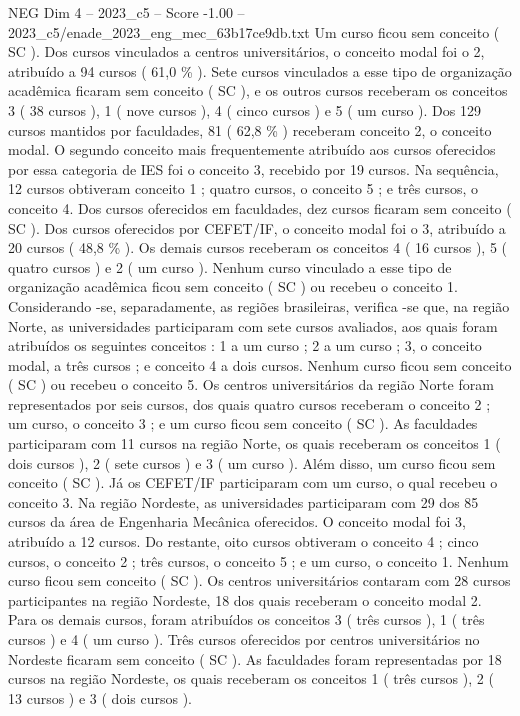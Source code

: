 \begin{textsample}{NEG Dim 4 – 2023\_c5 – Score -1.00 – 2023\_c5/enade\_2023\_eng\_mec\_63b17ce9db.txt}
Um curso ficou sem conceito ( SC ).
Dos cursos vinculados a centros universitários, o conceito modal foi o 2, atribuído a 94 cursos ( 61,0 \% ).
Sete cursos vinculados a esse tipo de organização acadêmica ficaram sem conceito ( SC ), e os outros cursos receberam os conceitos 3 ( 38 cursos ), 1 ( nove cursos ), 4 ( cinco cursos ) e 5 ( um curso ).
Dos 129 cursos mantidos por faculdades, 81 ( 62,8 \% ) receberam conceito 2, o conceito modal.
O segundo conceito mais frequentemente atribuído aos cursos oferecidos por essa categoria de IES foi o conceito 3, recebido por 19 cursos.
Na sequência, 12 cursos obtiveram conceito 1 ; quatro cursos, o conceito 5 ; e três cursos, o conceito 4.
Dos cursos oferecidos em faculdades, dez cursos ficaram sem conceito ( SC ).
Dos cursos oferecidos por CEFET/IF, o conceito modal foi o 3, atribuído a 20 cursos ( 48,8 \% ).
Os demais cursos receberam os conceitos 4 ( 16 cursos ), 5 ( quatro cursos ) e 2 ( um curso ).
Nenhum curso vinculado a esse tipo de organização acadêmica ficou sem conceito ( SC ) ou recebeu o conceito 1.
Considerando -se, separadamente, as regiões brasileiras, verifica -se que, na região Norte, as universidades participaram com sete cursos avaliados, aos quais foram atribuídos os seguintes conceitos : 1 a um curso ; 2 a um curso ; 3, o conceito modal, a três cursos ; e conceito 4 a dois cursos.
Nenhum curso ficou sem conceito ( SC ) ou recebeu o conceito 5.
Os centros universitários da região Norte foram representados por seis cursos, dos quais quatro cursos receberam o conceito 2 ; um curso, o conceito 3 ; e um curso ficou sem conceito ( SC ).
As faculdades participaram com 11 cursos na região Norte, os quais receberam os conceitos 1 ( dois cursos ), 2 ( sete cursos ) e 3 ( um curso ).
Além disso, um curso ficou sem conceito ( SC ).
Já os CEFET/IF participaram com um curso, o qual recebeu o conceito 3.
Na região Nordeste, as universidades participaram com 29 dos 85 cursos da área de Engenharia Mecânica oferecidos.
O conceito modal foi 3, atribuído a 12 cursos.
Do restante, oito cursos obtiveram o conceito 4 ; cinco cursos, o conceito 2 ; três cursos, o conceito 5 ; e um curso, o conceito 1.
Nenhum curso ficou sem conceito ( SC ).
Os centros universitários contaram com 28 cursos participantes na região Nordeste, 18 dos quais receberam o conceito modal 2.
Para os demais cursos, foram atribuídos os conceitos 3 ( três cursos ), 1 ( três cursos ) e 4 ( um curso ).
Três cursos oferecidos por centros universitários no Nordeste ficaram sem conceito ( SC ).
As faculdades foram representadas por 18 cursos na região Nordeste, os quais receberam os conceitos 1 ( três cursos ), 2 ( 13 cursos ) e 3 ( dois cursos ).

\end{textsample}
